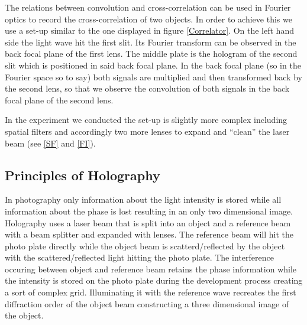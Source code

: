The relations between convolution and cross-correlation can be used in Fourier optics to record the cross-correlation of two objects. In order to achieve this we use a set-up similar to the one displayed in figure \ref{Correlator}. On the left hand side the light wave hit the first slit. Its Fourier transform can be observed in the back focal plane of the first lens. The middle plate is the hologram of the second slit which is positioned in said back focal plane. In the back focal plane (so in the Fourier space so to say) both signals are multiplied and then transformed back by the second lens, so that we observe the convolution of both signals in the back focal plane of the second lens.

 

In the experiment we conducted the set-up is slightly more complex including spatial filters and accordingly two more lenses to expand and ``clean'' the laser beam (see \ref{SF} and \ref{FI}). 
\subsection{Principles of Holography}

In photography only information about the light intensity is stored while all information about the phase is lost resulting in an only two dimensional image. Holography uses a laser beam that is split into an object and a reference beam with a beam splitter and expanded with lenses. 
The reference beam will hit the photo plate directly while the object beam is scatterd/reflected by the object with the scattered/reflected light hitting the photo plate. The interference occuring between object and reference beam retains the phase information while the intensity is stored on the photo plate during the development process creating a sort of complex grid. Illuminating it with the reference wave recreates the first diffraction order of the object beam constructing a three dimensional image of the object.

